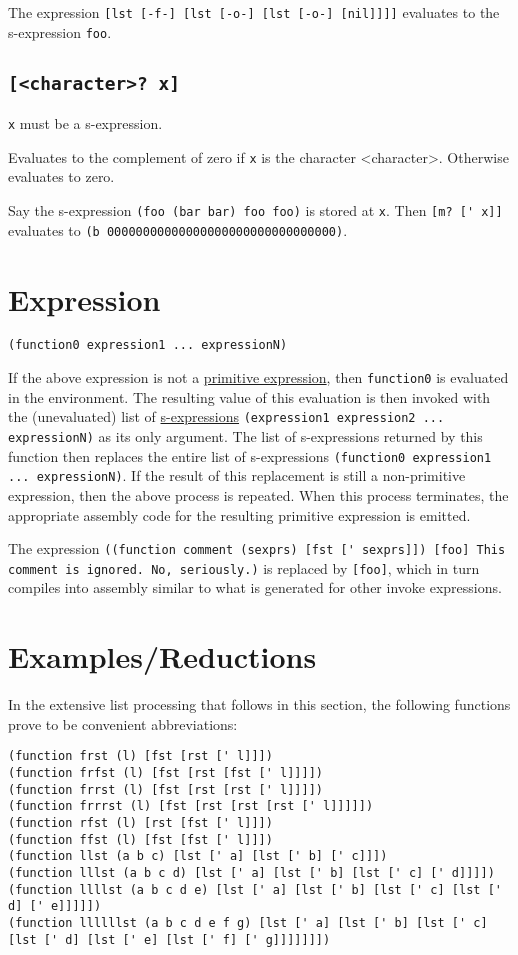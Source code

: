 \documentclass[twocolumn,landscape]{article}
\begin{document}
      The expression \lstinline{[lst [-f-] [lst [-o-] [lst [-o-] [nil]]]]} evaluates to the s-expression \lstinline{foo}.
    \subsection{\lstinline{[<character>? x]}}
      \lstinline{x} must be a s-expression.

      Evaluates to the complement of zero if \lstinline{x} is the character <character>. Otherwise evaluates to zero.

      Say the s-expression \lstinline{(foo (bar bar) foo foo)} is stored at \lstinline{x}. Then \lstinline{[m? [' x]]} evaluates to \lstinline{(b 00000000000000000000000000000000)}.

  \section{Expression}\label{sec:expression}
    \begin{lstlisting}
(function0 expression1 ... expressionN)
    \end{lstlisting}
    If the above expression is not a \hyperref[sec:primitive-expressions]{primitive expression}, then \lstinline{function0} is evaluated in the environment. The resulting value of this evaluation is then invoked with the (unevaluated) list of \hyperref[sec:internal-representation]{s-expressions} \lstinline{(expression1 expression2 ... expressionN)} as its only argument. The list of s-expressions returned by this function then replaces the entire list of s-expressions \lstinline{(function0 expression1 ... expressionN)}. If the result of this replacement is still a non-primitive expression, then the above process is repeated. When this process terminates, the appropriate assembly code for the resulting primitive expression is emitted.

    The expression \lstinline{((function comment (sexprs) [fst [' sexprs]]) [foo] This comment is ignored. No, seriously.)} is replaced by \lstinline{[foo]}, which in turn compiles into assembly similar to what is generated for other invoke expressions.

  \section{Examples/Reductions}\label{sec:examplesreductions}
    In the extensive list processing that follows in this section, the following functions prove to be convenient abbreviations:
    \begin{lstlisting}[caption={abbreviations.l2}]
(function frst (l) [fst [rst [' l]]])
(function frfst (l) [fst [rst [fst [' l]]]])
(function frrst (l) [fst [rst [rst [' l]]]])
(function frrrst (l) [fst [rst [rst [rst [' l]]]]])
(function rfst (l) [rst [fst [' l]]])
(function ffst (l) [fst [fst [' l]]])
(function llst (a b c) [lst [' a] [lst [' b] [' c]]])
(function lllst (a b c d) [lst [' a] [lst [' b] [lst [' c] [' d]]]])
(function llllst (a b c d e) [lst [' a] [lst [' b] [lst [' c] [lst [' d] [' e]]]]])
(function llllllst (a b c d e f g) [lst [' a] [lst [' b] [lst [' c] [lst [' d] [lst [' e] [lst [' f] [' g]]]]]]])
    \end{lstlisting}
\end{document}
